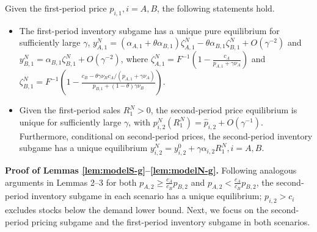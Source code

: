 \documentclass[nonblindrev,copyedit]{informs1}
\begin{document}
\begin{APPENDICES}
\begin{lemma} \label{lem:modelN-g}
Given the first-period price $p_{i,1}, i= A, B$, the following statements hold.
    \begin{itemize}
    \item [(a)] The first-period inventory subgame has a unique pure equilibrium for sufficiently large $\gamma$, $y_{A,1}^N=(\alpha_{A,1}+\theta\alpha_{B,1})\zeta_{A,1}^N -\theta\alpha_{B,1}\zeta_{B,1}^N + O({\gamma^{-2}})$ and $y_{B,1}^N=\alpha_{B,1}\zeta_{B,1}^N + O({\gamma^{-2}})$, where $\zeta^N_{A,1}  =  F^{-1}\left( 1- \frac{ c_A}{p_{A,1}+\gamma\nu_A} \right)$ and $\zeta^N_{B,1}  =  F^{-1}\left( 1- \frac{c_B-\theta\gamma\nu_Bc_A/(p_{A,1}+\gamma\nu_A)}{p_{B,1}+(1-\theta)\gamma\nu_B} \right)$.
    \item [(b)] Given the first-period sales $R^N_1>0$, the second-period price equilibrium is unique for sufficiently large $\gamma$, with $p^N_{i,2}(R^N_1)=\widehat p_{i,2}+O(\gamma^{-1})$. Furthermore, conditional on second-period prices, the second-period inventory subgame has a unique equilibrium $y_{i,2}^N=y_{i,2}^0+\gamma\alpha_{i,2}R^N_1, i = A, B$.
    \end{itemize}
\end{lemma}

\noindent\textbf{Proof of Lemmas \ref{lem:modelS-g}--\ref{lem:modelN-g}.}
Following analogous arguments in Lemmas 2--3 for both $p_{A,2} \geq \frac{c_A}{c_B} p_{B,2}$ and $p_{A,2} < \frac{c_A}{c_B} p_{B,2}$, the second-period inventory subgame in each scenario has a unique equilibrium; $p_{i,2}>c_i$ excludes stocks below the demand lower bound.
Next, we focus on the second-period pricing subgame and the first-period inventory subgame in both scenarios.


\end{APPENDICES}
\end{document}
